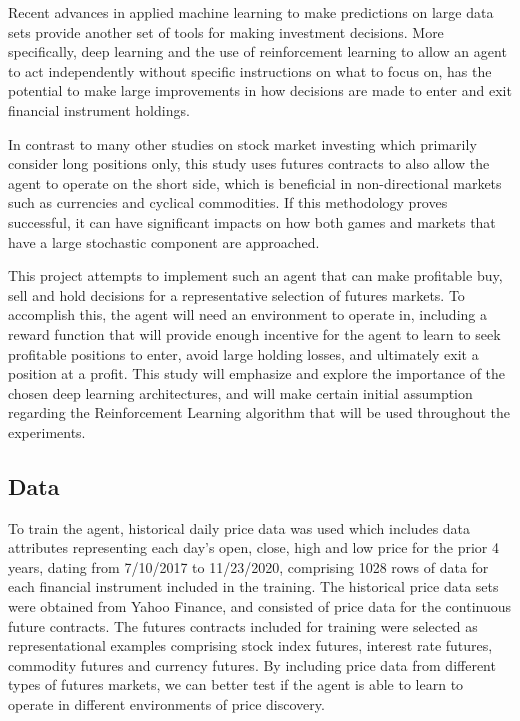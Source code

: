 \documentclass[10pt,twocolumn,letterpaper]{article}
\begin{document}
Recent advances in applied machine learning to make predictions on large data sets provide another set of tools for making investment decisions. More specifically, deep learning and the use of reinforcement learning to allow an agent to act independently without specific instructions on what to focus on, has the potential to make large improvements in how decisions are made to enter and exit financial instrument holdings. 

In contrast to many other studies on stock market investing which primarily consider long positions only, this study uses futures contracts to also allow the agent to operate on the short side, which is beneficial in non-directional markets such as currencies and cyclical commodities. If this methodology proves successful, it can have significant impacts on how both games and markets that have a large stochastic component are approached.

This project attempts to implement such an agent that can make profitable buy, sell and hold decisions for a representative selection of futures markets. To accomplish this, the agent will need an environment to operate in, including a reward function that will provide enough incentive for the agent to learn to seek profitable positions to enter, avoid large holding losses, and ultimately exit a position at a profit. This study will emphasize and explore the importance of the chosen deep learning architectures, and will make certain initial assumption regarding the Reinforcement Learning algorithm that will be used throughout the experiments.

\subsection{Data}
To train the agent, historical daily price data was used which includes data attributes representing each day's open, close, high and low price for the prior 4 years, dating from 7/10/2017 to 11/23/2020, comprising 1028 rows of data for each financial instrument included in the training. The historical price data sets were obtained from Yahoo Finance, and consisted of price data for the continuous future contracts. The futures contracts included for training were selected as representational examples comprising stock index futures, interest rate futures, commodity futures and currency futures. By including price data from different types of futures markets, we can better test if the agent is able to learn to operate in different environments of price discovery.
\end{document}
